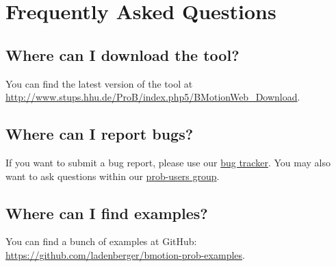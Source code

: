 \chapter{Frequently Asked Questions}
\label{faq}

\section{Where can I download the tool?}
\label{download}

You can find the latest version of the tool at \url{http://www.stups.hhu.de/ProB/index.php5/BMotionWeb_Download}.

\section{Where can I report bugs?}
\label{bugs}

If you want to submit a bug report, please use our \href{http://jira.cobra.cs.uni-duesseldorf.de/}{bug tracker}. 
You may also want to ask questions within our \href{https://groups.google.com/d/forum/prob-users}{prob-users group}.

\section{Where can I find examples?}
\label{examples}

You can find a bunch of examples at GitHub: \url{https://github.com/ladenberger/bmotion-prob-examples}.

